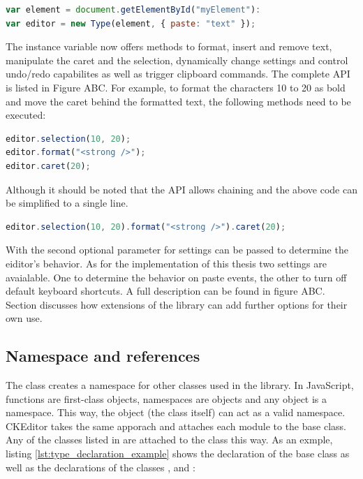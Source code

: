 \begin{lstlisting}[language=JavaScript, caption=Type instantiation, label=lst:type_instantiation]
var element = document.getElementById("myElement"):
var editor = new Type(element, { paste: "text" });
\end{lstlisting}

The  instance variable now offers methods to format, insert and remove text, manipulate the caret and the selection, dynamically change settings and control undo/redo capabilites as well as trigger clipboard commands. The complete API is listed in Figure ABC. For example, to format the characters 10 to 20 as bold and move the caret behind the formatted text, the following methods need to be executed:

\begin{lstlisting}[language=JavaScript, caption=Example commands to format text, label=lst:type_format_example]
editor.selection(10, 20);
editor.format("<strong />");
editor.caret(20);
\end{lstlisting}

\noindent Although it should be noted that the API allows chaining and the above code can be simplified to a single line.

\begin{lstlisting}[language=JavaScript, caption=Example chaining, label=lst:type_chaining_example]
editor.selection(10, 20).format("<strong />").caret(20);
\end{lstlisting}

With the second optional parameter for  settings can be passed to determine the eiditor's behavior. As for the implementation of this thesis two settings are avaialable. One to determine the behavior on paste events, the other to turn off default keyboard shortcuts. A full description can be found in figure ABC. Section  discusses how extensions of the library can add further options for their own use.

\subsection{Namespace and references} 
\label{subsec:namespace_and_refs}

The  class creates a namespace for other classes used in the library. In JavaScript, functions are first-class objects, namespaces are objects and any object is a namespace. This way, the   object (the class itself) can act as a valid namespace. CKEditor takes the same apporach and attaches each module to the  base class. Any of the classes listed in  are attached to the  class this way. As an exmple, listing \ref{lst:type_declaration_example} shows the declaration of the  base class as well as the declarations of the classes ,  and :

